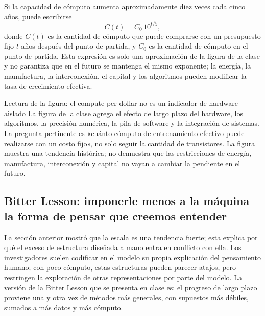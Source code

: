 \documentclass[a4paper]{article}
\begin{document}
Si la capacidad de cómputo aumenta aproximadamente diez veces cada cinco años, puede escribirse
\[
C(t)=C_0\,10^{t/5},
\]
donde $C(t)$ es la cantidad de cómputo que puede comprarse con un presupuesto fijo $t$ años después del punto de partida, y $C_0$ es la cantidad de cómputo en el punto de partida. Esta expresión es solo una aproximación de la figura de la clase y no garantiza que en el futuro se mantenga el mismo exponente; la energía, la manufactura, la interconexión, el capital y los algoritmos pueden modificar la tasa de crecimiento efectiva.

\begin{knowledgebox}{Lectura de la figura: el compute per dollar no es un indicador de hardware aislado}
La figura de la clase agrega el efecto de largo plazo del hardware, los algoritmos, la precisión numérica, la pila de software y la integración de sistemas. La pregunta pertinente es «cuánto cómputo de entrenamiento efectivo puede realizarse con un costo fijo», no solo seguir la cantidad de transistores. La figura muestra una tendencia histórica; no demuestra que las restricciones de energía, manufactura, interconexión y capital no vayan a cambiar la pendiente en el futuro.
\end{knowledgebox}


\subsection{Bitter Lesson: imponerle menos a la máquina la forma de pensar que creemos entender}

La sección anterior mostró que la escala es una tendencia fuerte; esta explica por qué el exceso de estructura diseñada a mano entra en conflicto con ella. Los investigadores suelen codificar en el modelo su propia explicación del pensamiento humano; con poco cómputo, estas estructuras pueden parecer atajos, pero restringen la exploración de otras representaciones por parte del modelo. La versión de la Bitter Lesson que se presenta en clase es: el progreso de largo plazo proviene una y otra vez de métodos más generales, con supuestos más débiles, sumados a más datos y más cómputo.
\end{document}

